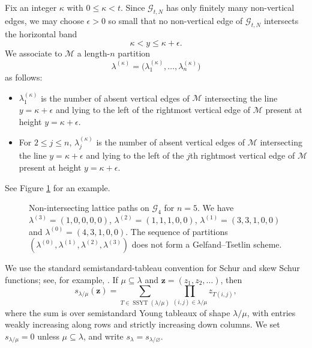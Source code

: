 \documentclass[11pt]{amsart}
\theoremstyle{plain}
\newcommand\LHLL[2]{
  \def\X{#1} \def\Y{#2}
  \foreach \i in {0,...,\X}
  {
\pgfmathsetmacro{\m}{\Y-1/(\i+1)};
    \draw[gray,very thin] (\i,0) -- (\i,\m);
    \node at (\i,-.3) {\i};
  }
  \foreach \j in {0,...,\Y}
  {
    \node at (-.3,\j) {\j};
  }
\pgfmathsetmacro{\m}{\Y-1};
  \foreach \x in {1,...,\X}
{ \foreach \j in {0,...,\m}
  {
\draw[gray,very thin] (\x-1,\j) -- (\x,\j);
}}
 \foreach \i in {2,...,\X}
 \foreach \j in {0,...,\m} 
{\foreach \y in {2,...,\i}
{
\pgfmathsetmacro{\w}{\j+(\y-1)/\i};
\pgfmathsetmacro{\z}{\j+(\y-1)/(\i+1)};
\draw[gray,very thin] (\i-1,\w) -- (\i,\z);
}}
\node at (\X+1,1) {$\cdots$};
\node at (\X+1,\Y-1) {$\cdots$};
}
\numberwithin{equation}{section}
\numberwithin{theorem}{section}
\numberwithin{figure}{section}
\begin{document}
Fix an integer \(\kappa\) with \(0\le \kappa<t\). Since \(\mathcal G_{t,N}\)
has only finitely many non-vertical edges, we may choose \(\epsilon>0\) so small
that no non-vertical edge of \(\mathcal G_{t,N}\) intersects the horizontal band
\[
    \kappa < y \le \kappa+\epsilon .
\]
We associate to \(\mathcal M\) a length-\(n\) partition
\[
    \lambda^{(\kappa)}
    =
    \bigl(\lambda^{(\kappa)}_1,\ldots,\lambda^{(\kappa)}_n\bigr)
\]
as follows:
\begin{itemize}
    \item \(\lambda^{(\kappa)}_1\) is the number of absent vertical edges of
    \(\mathcal M\) intersecting the line \(y=\kappa+\epsilon\) and lying to the
    left of the rightmost vertical edge of \(\mathcal M\) present at height
    \(y=\kappa+\epsilon\).

    \item For \(2\le j\le n\), \(\lambda^{(\kappa)}_j\) is the number of absent
    vertical edges of \(\mathcal M\) intersecting the line \(y=\kappa+\epsilon\)
    and lying to the left of the \(j\)th rightmost vertical edge of
    \(\mathcal M\) present at height \(y=\kappa+\epsilon\).
\end{itemize}
See Figure \ref{fig:lambdakappaEx} for an example.

\begin{figure}
  \centering
{}
\caption{Non-intersecting lattice paths on ${\mathcal G}_4$
for $n=5$.  We have $\lambda^{(3)}=(1,0,0,0,0)$,
$\lambda^{(2)}=(1,1,1,0,0)$, $\lambda^{(1)}=(3,3,1,0,0)$ and $\lambda^{(0)}=(4,3,1,0,0)$.
The sequence of partitions $(\lambda^{(0)},\lambda^{(1)},\lambda^{(2)},\lambda^{(3)})$ does not form a Gelfand--Tsetlin scheme.}\label{fig:lambdakappaEx} 
\end{figure}


We use the standard semistandard-tableau convention for Schur and skew Schur
functions; see, for example, \cite[Chapter I, Section 5]{Macdonald95}.  If
\(\mu\subseteq\lambda\) and \(\mathbf z=(z_1,z_2,\ldots)\), then
\[
    s_{\lambda/\mu}(\mathbf z)
    =
    \sum_{T\in \operatorname{SSYT}(\lambda/\mu)}
    \prod_{(i,j)\in\lambda/\mu} z_{T(i,j)},
\]
where the sum is over semistandard Young tableaux of shape \(\lambda/\mu\),
with entries weakly increasing along rows and strictly increasing down columns.
We set \(s_{\lambda/\mu}=0\) unless \(\mu\subseteq\lambda\), and write
\(s_\lambda=s_{\lambda/\varnothing}\).
\end{document}
